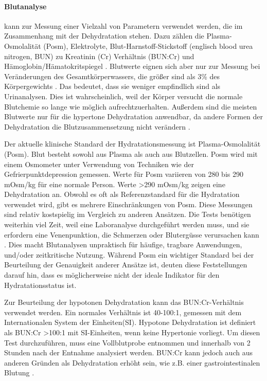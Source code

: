 \documentclass[10pt,a4paper,headinclude,twoside, plainheadsepline, open=right, numbers=noenddot, twocolumn]{article}
\begin{document}
\paragraph{Blutanalyse} kann zur Messung einer Vielzahl von Parametern verwendet werden, die im Zusammenhang mit der Dehydratation stehen.
Dazu zählen die Plasma-Osmolalität (Posm), Elektrolyte, Blut-Harnstoff-Stickstoff (englisch blood urea nitrogen, BUN) zu Kreatinin (Cr) Verhältnis (BUN:Cr) und Hämoglobin/Hämatokritspiegel \cite{oppliger2002hydration}.
Blutwerte eignen sich aber nur zur Messung bei Veränderungen des Gesamtkörperwassers, die größer sind als 3\% des Körpergewichts \cite{francesconi1987urinary}.
Das bedeutet, dass sie weniger empfindlich sind als Urinanalysen.
Dies ist wahrscheinlich, weil der Körper versucht die normale Blutchemie so lange wie möglich aufrechtzuerhalten.
Außerdem sind die meisten Blutwerte nur für die hypertone Dehydratation anwendbar, da andere Formen der Dehydratation die Blutzusammensetzung nicht verändern \cite{garret2018engineering}.

Der aktuelle klinische Standard der Hydratationsmessung ist Plasma-Osmolalität (Posm).
Blut besteht sowohl aus Plasma als auch aus Blutzellen.
Posm wird mit einem Osmometer unter Verwendung von Techniken wie der Gefrierpunktdepression gemessen.
Werte für Posm variieren von 280 bis 290 mOsm/kg für eine normale Person.
Werte >290 mOsm/kg zeigen eine Dehydratation an.
Obwohl es oft als Referenzstandard für die Hydratation verwendet wird, gibt es mehrere Einschränkungen von Posm.
Diese Messungen sind relativ kostspielig im Vergleich zu anderen Ansätzen.
Die Tests benötigen weiterhin viel Zeit, weil eine Laboranalyse durchgeführt werden muss, und sie erfordern eine Venenpunktion, die Schmerzen oder Blutergüsse verursachen kann \cite{armstrong1994urinary}. 
Dies macht Blutanalysen unpraktisch für häufige, tragbare Anwendungen, und/oder zeitkritische Nutzung. 
Während Posm ein wichtiger Standard bei der Beurteilung der Genauigkeit anderer Ansätze ist, deuten diese Feststellungen darauf hin, dass es möglicherweise nicht der ideale Indikator für den Hydratationsstatus ist\cite{garret2018engineering}.

Zur Beurteilung der hypotonen Dehydratation kann das BUN:Cr-Verhältnis verwendet werden. 
Ein normales Verhältnis ist 40-100:1, gemessen mit dem Internationalen System der Einheiten(SI).
Hypotone Dehydratation ist definiert als BUN:Cr >100:1 mit SI-Einheiten, wenn keine Hypertonie vorliegt.
Um diesen Test durchzuführen, muss eine Vollblutprobe entnommen und innerhalb von 2 Stunden nach der Entnahme analysiert werden.
BUN:Cr kann jedoch auch aus anderen Gründen als Dehydratation erhöht sein, wie z.B. einer gastrointestinalen Blutung \cite{garret2018engineering}.
\end{document}
